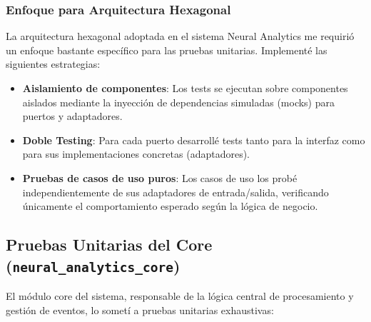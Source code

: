 \subsubsection{Enfoque para Arquitectura Hexagonal}

La arquitectura hexagonal adoptada en el sistema Neural Analytics me requirió un enfoque bastante específico para las pruebas unitarias. Implementé las siguientes estrategias:

\begin{itemize}
    \item \textbf{Aislamiento de componentes}: Los tests se ejecutan sobre componentes aislados mediante la inyección de dependencias simuladas (mocks) para puertos y adaptadores.
    
    \item \textbf{Doble Testing}: Para cada puerto desarrollé tests tanto para la interfaz como para sus implementaciones concretas (adaptadores). 
    
    \item \textbf{Pruebas de casos de uso puros}: Los casos de uso los probé independientemente de sus adaptadores de entrada/salida, verificando únicamente el comportamiento esperado según la lógica de negocio.
\end{itemize}

\newpage
\subsection{Pruebas Unitarias del Core (\texttt{neural\_analytics\_core})}

El módulo core del sistema, responsable de la lógica central de procesamiento y gestión de eventos, lo sometí a pruebas unitarias exhaustivas:

